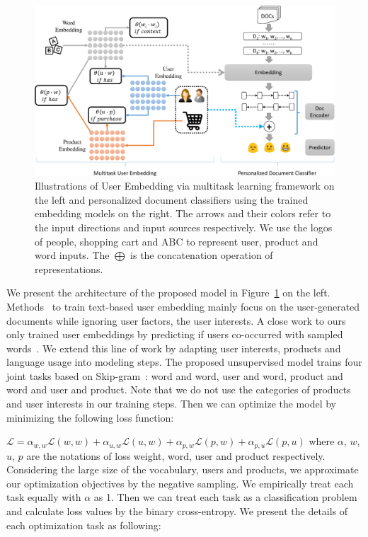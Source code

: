 \begin{figure}[t!]
\centering
\includegraphics[width=1\textwidth]{./images/chapter4/uembedding/userEmbedding-diagram.pdf}
\caption{Illustrations of User Embedding via multitask learning framework on the left and personalized document classifiers using the trained embedding models on the right. The arrows and their colors refer to the input directions and input sources respectively. We use the logos of people, shopping cart and ABC to represent user, product and word inputs. The $\bigoplus$ is the concatenation operation of representations.}
\label{chap4:fig:uemb_diagram}
\end{figure}

We present the architecture of the proposed model in Figure~\ref{chap4:fig:uemb_diagram} on the left.
Methods~\cite{pan2019social} to train text-based user embedding mainly focus on the user-generated documents while ignoring user factors, the user interests. 
A close work to ours only trained user embeddings by predicting if users co-occurred with sampled words~\cite{amir2017quantifying}.
We extend this line of work by adapting user interests, products and language usage into modeling steps.
The proposed unsupervised model trains four joint tasks based on Skip-gram~\cite{mikolov2013distributed}: word and word, user and word, product and word and user and product. 
Note that we do not use the categories of products and user interests in our training steps.
Then we can optimize the model by minimizing the following loss function: 

$\mathcal{L} = \alpha_{w,w}\mathcal{L}(w, w) + \alpha_{u,w}\mathcal{L}(u, w) + \alpha_{p,w}\mathcal{L}(p, w) + \alpha_{p,u}\mathcal{L}(p, u)$
where $\alpha$, $w$, $u$, $p$ are the notations of loss weight, word, user and product respectively.
Considering the large size of the vocabulary, users and products, we approximate our optimization objectives by the negative sampling.
We empirically treat each task equally with $\alpha$ as 1.
Then we can treat each task as a classification problem and calculate loss values by the binary cross-entropy.
We present the details of each optimization task as following:


